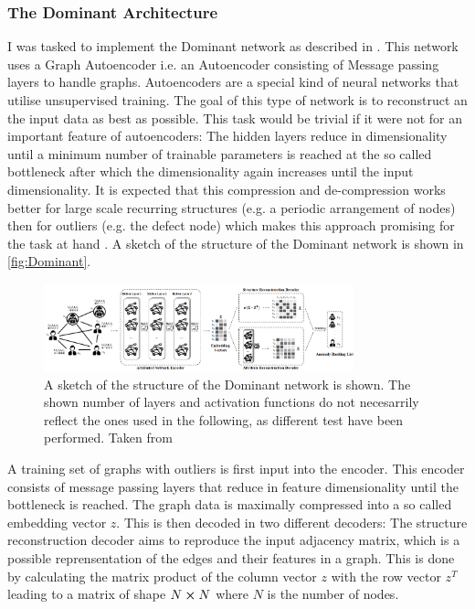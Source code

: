 \documentclass[11pt,a4paper]{article}
\begin{document}
\subsubsection{The Dominant Architecture}
I was tasked to implement the Dominant network as described in \cite{dingDeepAnomalyDetection2019}. 
This network uses a Graph Autoencoder i.e. an Autoencoder consisting of Message passing layers to handle graphs. 
Autoencoders are a special kind of neural networks that utilise unsupervised training. 
The goal of this type of network is to reconstruct an the input data as best as possible. 
This task would be trivial if it were not for an important feature of autoencoders: 
The hidden layers reduce in dimensionality until a minimum number of trainable parameters is reached at the so called bottleneck after which the dimensionality again increases until the input dimensionality. 
It is expected that this compression and de-compression works better for large scale recurring structures (e.g. a periodic arrangement of nodes) then for outliers (e.g. the defect node) which makes this approach promising for the task at hand \cite{dingDeepAnomalyDetection2019}. 
A sketch of the structure of the Dominant network is shown in \autoref{fig:Dominant}.
\begin{figure}[htbp]
    \centering
    \includegraphics[width=0.8\textwidth]{images/ding_1.png}
    \caption{A sketch of the structure of the Dominant network is shown. The shown number of layers and activation functions do not necesarrily reflect the ones used in the following, as different test have been performed. Taken from \cite[Fig.1]{dingDeepAnomalyDetection2019}}
    \label{fig:Dominant}
\end{figure}
A training set of graphs with outliers is first input into the encoder. 
This encoder consists of message passing layers that reduce in feature dimensionality until the bottleneck is reached. 
The graph data is maximally compressed into a so called embedding vector $z$. 
This is then decoded in two different decoders: 
The structure reconstruction decoder aims to reproduce the input adjacency matrix, which is a possible reprensentation of the edges and their features in a graph. 
This is done by calculating the matrix product of the column vector $z$ with the row vector $z^T$ leading to a matrix of shape $N\cross N$ where $N$ is the number of nodes. 
\end{document}
